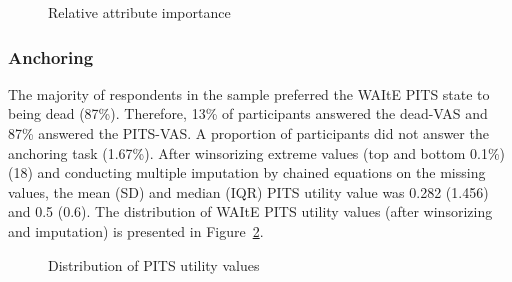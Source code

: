 \documentclass[
  letterpaper,
  DIV=11,
  numbers=noendperiod]{scrartcl}
\begin{document}
\begin{figure}


\caption{\label{fig-rai}Relative attribute importance}

\end{figure}%

\subsubsection{Anchoring}\label{anchoring}

The majority of respondents in the sample preferred the WAItE PITS state
to being dead (87\%). Therefore, 13\% of participants answered the
dead-VAS and 87\% answered the PITS-VAS. A proportion of participants
did not answer the anchoring task (1.67\%). After winsorizing extreme
values (top and bottom 0.1\%) (18) and conducting multiple imputation by
chained equations on the missing values, the mean (SD) and median (IQR)
PITS utility value was 0.282 (1.456) and 0.5 (0.6). The distribution of
WAItE PITS utility values (after winsorizing and imputation) is
presented in Figure~\ref{fig-hist}.

\begin{figure}


\caption{\label{fig-hist}Distribution of PITS utility values}

\end{figure}%
\end{document}
